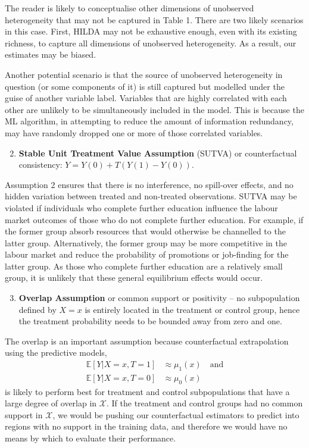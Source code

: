 \documentclass[12pt, a4paper]{article}
\begin{document}
The reader is likely to conceptualise other dimensions of unobserved heterogeneity that may not be captured in Table 1. There are two likely scenarios in this case. First, HILDA may not be exhaustive enough, even with its existing richness, to capture all dimensions of unobserved heterogeneity. As a result, our estimates may be biased. 

Another potential scenario is that the source of unobserved heterogeneity in question (or some components of it) is still captured but modelled under the guise of another variable label. Variables that are highly correlated with each other are unlikely to be simultaneously included in the model. This is because the ML algorithm, in attempting to reduce the amount of information redundancy, may have randomly dropped one or more of those correlated variables. 

\begin{enumerate}
  \setcounter{enumi}{1}
  \item \textbf{Stable Unit Treatment Value Assumption} (SUTVA) or counterfactual consistency: $Y = Y(0) +T(Y(1) - Y(0))$. 
\end{enumerate}  

Assumption 2 ensures that there is no interference, no spill-over effects, and no hidden variation between treated and non-treated observations. SUTVA may be violated if individuals who complete further education influence the labour market outcomes of those who do not complete further education. For example, if the former group absorb resources that would otherwise be channelled to the latter group. Alternatively, the former group may be more competitive in the labour market and reduce the probability of promotions or job-finding for the latter group. As those who complete further education are a relatively small group, it is unlikely that these general equilibrium effects would occur. 

\begin{enumerate}
  \setcounter{enumi}{2}
  \item \textbf{Overlap Assumption} or common support or positivity -- no
    subpopulation defined by $X = x$ is entirely located in the treatment or
    control group, hence the treatment probability needs to be bounded away
    from zero and one.
\end{enumerate}

The overlap is an important assumption because counterfactual extrapolation
using the predictive models, 
\begin{align}
  \mathbb{E}[Y|X{=}x, T{=}1] &\approx \mu_1(x) \quad \textrm{and} \label{eq:T1} \\
  \mathbb{E}[Y|X{=}x, T{=}0] &\approx \mu_0(x) \label{eq:T0}
\end{align}
is likely to perform best for treatment and control subpopulations that have a
large degree of overlap in $\mathcal{X}$. If the treatment and control groups
had no common support in $\mathcal{X}$, we would be pushing our counterfactual
estimators to predict into regions with no support in the training data, and
therefore we would have no means by which to evaluate their performance.
\end{document}
